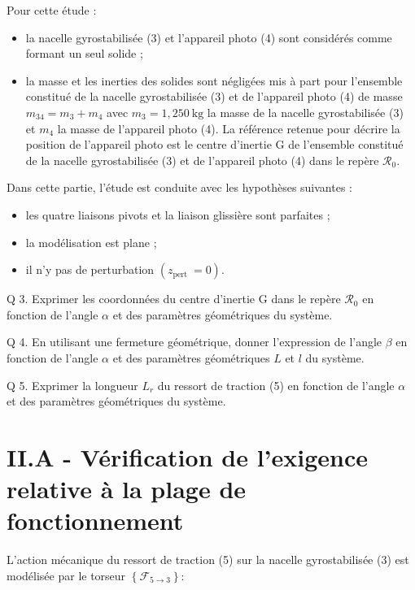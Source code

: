 \documentclass[10pt]{article}
\begin{document}
Pour cette étude :

\begin{itemize}
  \item la nacelle gyrostabilisée (3) et l'appareil photo (4) sont considérés comme formant un seul solide ;

  \item la masse et les inerties des solides sont négligées mis à part pour l'ensemble constitué de la nacelle gyrostabilisée (3) et de l'appareil photo (4) de masse $m_{34}=m_{3}+m_{4}$ avec $m_{3}=1,250 \mathrm{~kg}$ la masse de la nacelle gyrostabilisée (3) et $m_{4}$ la masse de l'appareil photo (4). La référence retenue pour décrire la position de l'appareil photo est le centre d'inertie $\mathrm{G}$ de l'ensemble constitué de la nacelle gyrostabilisée (3) et de l'appareil photo (4) dans le repère $\mathcal{R}_{0}$.

\end{itemize}

Dans cette partie, l'étude est conduite avec les hypothèses suivantes :

\begin{itemize}
  \item les quatre liaisons pivots et la liaison glissière sont parfaites ;

  \item la modélisation est plane ;

  \item il n'y pas de perturbation $\left(z_{\text {pert }}=0\right)$.

\end{itemize}

Q 3. Exprimer les coordonnées du centre d'inertie $\mathrm{G}$ dans le repère $\mathcal{R}_{0}$ en fonction de l'angle $\alpha$ et des paramètres géométriques du système.

Q 4. En utilisant une fermeture géométrique, donner l'expression de l'angle $\beta$ en fonction de l'angle $\alpha$ et des paramètres géométriques $L$ et $l$ du système.

Q 5. Exprimer la longueur $L_{r}$ du ressort de traction (5) en fonction de l'angle $\alpha$ et des paramètres géométriques du système.

\section{II.A - Vérification de l'exigence relative à la plage de fonctionnement}
L'action mécanique du ressort de traction (5) sur la nacelle gyrostabilisée (3) est modélisée par le torseur $\left\{\mathcal{F}_{5 \rightarrow 3}\right\}:$
\end{document}
